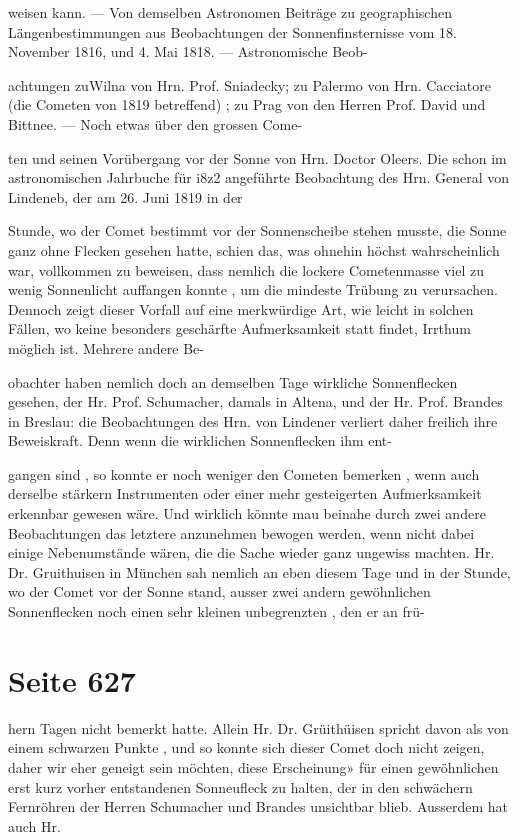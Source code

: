 \documentclass[10pt,a4paper]{article}
\begin{document}
weisen kann. — Von demselben Astronomen Beiträge zu geographischen Längenbestimmungen aus Beobachtungen der Sonnenfinsternisse vom 18. November 1816, und 4. Mai 1818. — Astronomische Beob-

achtungen zuWilna von Hrn. Prof. Sniadecky; zu Palermo von Hrn. Cacciatore (die Cometen von 1819 betreffend) ; zu Prag von den Herren Prof. David und Bittnee. — Noch etwas über den grossen Come-

ten und seinen Vorübergang vor der Sonne von Hrn. Doctor Oleers. Die schon im astronomischen Jahrbuche für i8z2 angeführte Beobachtung des Hrn. General von Lindeneb, der am 26. Juni 1819 in der

Stunde, wo der Comet bestimmt vor der Sonnenscheibe stehen musste, die Sonne ganz ohne Flecken gesehen hatte, schien das, was ohnehin höchst wahrscheinlich war, vollkommen zu beweisen, dass nemlich die lockere Cometenmasse viel zu wenig Sonnenlicht auffangen konnte , um die mindeste Trübung zu verursachen. Dennoch zeigt dieser Vorfall auf eine merkwürdige Art, wie leicht in solchen Fällen, wo keine besonders geschärfte Aufmerksamkeit statt findet, Irrthum möglich ist. Mehrere andere Be-

obachter haben nemlich doch an demselben Tage wirkliche Sonnenflecken gesehen, der Hr. Prof. Schumacher, damals in Altena, und der Hr. Prof. Brandes in Breslau: die Beobachtungen des Hrn. von Lindener verliert daher freilich ihre Beweiskraft. Denn wenn die wirklichen Sonnenflecken ihm ent-

gangen sind , so konnte er noch weniger den Cometen bemerken , wenn auch derselbe stärkern Instrumenten oder einer mehr gesteigerten Aufmerksamkeit erkennbar gewesen wäre. Und wirklich könnte mau beinahe durch zwei andere Beobachtungen das letztere anzunehmen bewogen werden, wenn nicht dabei einige Nebenumstände wären, die die Sache wieder ganz ungewiss machten. Hr. Dr. Gruithuisen in München sah nemlich an eben diesem Tage und in der Stunde, wo der Comet vor der Sonne stand, ausser zwei andern gewöhnlichen Sonnenflecken noch einen sehr kleinen unbegrenzten , den er an frü-


\newpage
\section*{Seite 627}
hern Tagen nicht bemerkt hatte. Allein Hr. Dr. Grüithüisen spricht davon als von einem schwarzen Punkte , und so konnte sich dieser Comet doch nicht zeigen, daher wir eher geneigt sein möchten, diese Erscheinung» für einen gewöhnlichen erst kurz vorher entstandenen Sonneufleck zu halten, der in den schwächern Fernröhren der Herren Schumacher und Brandes unsichtbar blieb. Ausserdem hat auch Hr.
\end{document}
